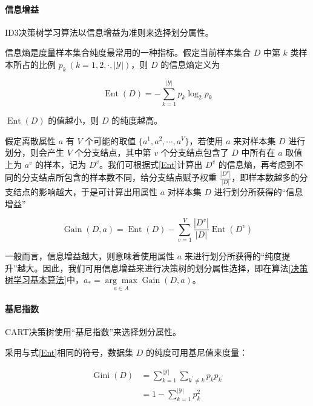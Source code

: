 \documentclass{ctexart}
\begin{document}
	\paragraph{信息增益} ID3决策树学习算法以信息增益为准则来选择划分属性。

	信息熵是度量样本集合纯度最常用的一种指标。假定当前样本集合 $D$ 中第 $k$ 类样本所占的比例 $p_k\ (k=1,2,\cdot,|\mathcal{Y}|)$，则 $D$ 的信息熵定义为
	
	\begin{equation}
		\operatorname{Ent}(D)=-\sum_{k=1}^{|\mathcal{Y}|} p_{k} \log _{2} p_{k}
		\label{Ent}
	\end{equation}

	$\operatorname{Ent}(D)$ 的值越小，则 $D$ 的纯度越高。
	
	假定离散属性 $a$ 有 $V$ 个可能的取值 $\{a^1,a^2,\cdots,a^V\}$，若使用 $a$ 来对样本集 $D$ 进行划分，则会产生 $V$ 个分支结点，其中第 $v$ 个分支结点包含了 $D$ 中所有在 $a$ 取值上为 $a^v$ 的样本，记为 $D^v$。我们可根据式\eqref{Ent}计算出 $D^v$ 的信息熵，再考虑到不同的分支结点所包含的样本数不同，给分支结点赋予权重 $\frac{|D^v|}{|D|}$，即样本数越多的分支结点的影响越大，于是可计算出用属性 $a$ 对样本集 $D$ 进行划分所获得的“信息增益”
	
	\begin{equation}
		\operatorname{Gain}(D, a)=\operatorname{Ent}(D)-\sum_{v=1}^{V} \frac{\left|D^{v}\right|}{|D|}\operatorname{Ent}\left(D^{v}\right)
		\label{Gain}
	\end{equation}

	一般而言，信息增益越大，则意味着使用属性 $a$ 来进行划分所获得的“纯度提升”越大。因此，我们可用信息增益来进行决策树的划分属性选择，即在算法\ref{决策树学习基本算法}中，$a_\ast=\underset{a \in A}{\arg \max } \operatorname{Gain}(D, a)$。
	
	\paragraph{基尼指数} CART决策树使用“基尼指数”来选择划分属性。
	
	采用与式\eqref{Ent}相同的符号，数据集 $D$ 的纯度可用基尼值来度量：
	
	\begin{equation}
		\begin{aligned}
			\operatorname{Gini}(D) &=\sum_{k=1}^{|\mathcal{Y}|} \sum_{k^{\prime} \neq k} p_{k} p_{k^{\prime}} \\
			&=1-\sum_{k=1}^{|\mathcal{Y}|} p_{k}^{2}
		\end{aligned}
	\end{equation}
\end{document}
